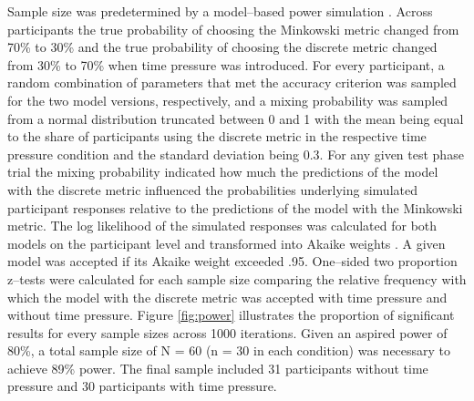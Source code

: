 \documentclass[a4paper,man,natbib]{apa6}
\begin{document}
Sample size was predetermined by a model--based power simulation \citep{gluth2019importance}. Across participants the true probability of choosing the Minkowski metric changed from 70\% to 30\% and the true probability of choosing the discrete metric changed from 30\% to 70\% when time pressure was introduced. For every participant, a random combination of parameters that met the accuracy criterion was sampled for the two model versions, respectively, and a mixing probability was sampled from a normal distribution truncated between 0 and 1 with the mean being equal to the share of participants using the discrete metric in the respective time pressure condition and the standard deviation being  0.3. For any given test phase trial the mixing probability indicated how much the predictions of the model with the discrete metric influenced the probabilities underlying simulated participant responses relative to the predictions of the model with the Minkowski metric. The log likelihood of the simulated responses was calculated for both models on the participant level and transformed into Akaike weights \citep{wagenmakers2004aic}. A given model was accepted if its Akaike weight exceeded .95. One--sided two proportion z--tests were calculated for each sample size comparing the relative frequency with which the model with the discrete metric was accepted with time pressure and without time pressure. Figure \ref{fig:power} illustrates the proportion of significant results for every sample sizes across 1000 iterations. Given an aspired power of 80\%, a total sample size of N = 60 (n = 30 in each condition) was necessary to achieve 89\% power. The final sample included 31 participants without time pressure and 30 participants with time pressure.
\end{document}
